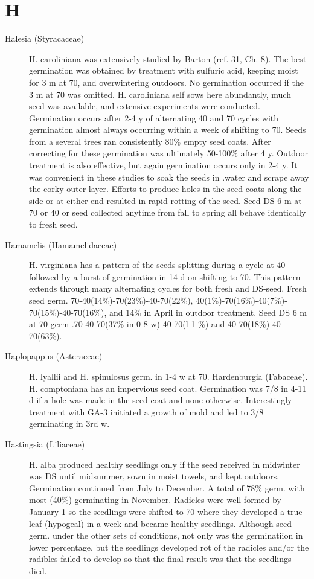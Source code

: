 \begin{description}
\end{description}
\section{H}
\begin{description}

\item[Halesia (Styracaceae)] H. caroliniana was extensively studied by Barton
(ref. 31, Ch. 8). The best germination was obtained by treatment with sulfuric acid,
keeping moist for 3 m at 70, and overwintering outdoors. No germination occurred if
the 3 m at 70 was omitted. H. caroliniana self sows here abundantly, much seed was
available, and extensive experiments were conducted. Germination occurs after 2-4 y
of alternating 40 and 70 cycles with germination almost always occurring within a
week of shifting to 70. Seeds from a several trees ran consistently 80\% empty seed
coats. After correcting for these germination was ultimately 50-100\% after 4 y.
Outdoor treatment is also effective, but again germination occurs only in 2-4 y. It was
convenient in these studies to soak the seeds in .water and scrape away the corky
outer layer. Efforts to produce holes in the seed coats along the side or at either end
resulted in rapid rotting of the seed. Seed DS 6 m at 70 or 40 or seed collected
anytime from fall to spring all behave identically to fresh seed.

\item[Hamamelis (Hamamelidaceae)] H. virginiana has a pattern of the seeds
splitting during a cycle at 40 followed by a burst of germination in 14 d on shifting to
70. This pattern extends through many alternating cycles for both fresh and DS-seed.
Fresh seed germ. 70-40(14\%)-70(23\%)-40-70(22\%), 40(1\%)-70(16\%)-40(7\%)-
70(15\%)-40-70(16\%), and 14\% in April in outdoor treatment. Seed DS 6 m at 70
germ .70-40-70(37\% in 0-8 w)-40-70(l 1 \%) and 40-70(18\%)-40-70(63\%).

\item[Haplopappus (Asteraceae)] H. lyallii and H. spinulosus germ. in 1-4 w at
70. Hardenburgia (Fabaceae). H. comptoniana has an impervious seed coat.
Germination was 7/8 in 4-11 d if a hole was made in the seed coat and none
otherwise. Interestingly treatment with GA-3 initiated a growth of mold and led to 3/8
germinating in 3rd w.

\item[Hastingsia (Liliaceae)] H. alba produced healthy seedlings only if the seed
received in midwinter was DS until midsummer, sown in moist towels, and kept
outdoors. Germination continued from July to December. A total of 78\% germ. with
most (40\%) germinating in November. Radicles were well formed by January 1 so the
seedlings were shifted to 70 where they developed a true leaf (hypogeal) in a week
and became healthy seedlings. Although seed germ. under the other sets of
conditions, not only was the germinatiion in lower percentage, but the seedlings
developed rot of the radicles and/or the radibles failed to develop so that the final
result was that the seedlings died.


\end{description}
